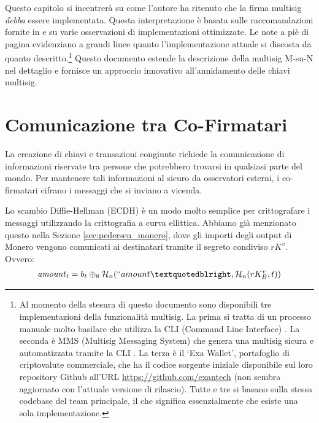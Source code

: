 Questo capitolo si incentrerà su come l'autore ha ritenuto che la firma multisig \emph{debba} essere implementata. Questa interpretazione è basata sulle raccomandazioni fornite in \cite{MRL-0009-multisig} e su varie osservazioni di implementazioni ottimizzate. Le note a piè di pagina evidenziano a grandi linee quanto l'implementazione attuale si discosta da quanto descritto.\footnote{Al momento della stesura di questo documento sono disponibili tre implementazioni della funzionalità multisig. La prima si tratta di un processo manuale molto basilare che utilizza la CLI (Command Line Interface) \cite{cli-22multisig-instructions}. La seconda è MMS (Multisig Messaging System) che genera una multisig sicura e automatizzata tramite la CLI \cite{mms-manual, mms-project-proposal}. La terza è il `Exa Wallet', portafoglio di criptovalute commerciale, che ha il codice sorgente iniziale disponibile sul loro repository Github all'URL \url{https://github.com/exantech} (non sembra aggiornato con l'attuale versione di rilascio). Tutte e tre si basano sulla stessa codebase del team principale, il che significa essenzialmente che esiste una sola implementazione.} Questo documento estende la descrizione della multisig M-su-N nel dettaglio e fornisce un approccio innovativo all'annidamento delle chiavi multisig.



\section{Comunicazione tra Co-Firmatari}
\label{sec:communicating}

La creazione di chiavi e transazioni congiunte richiede la comunicazione di informazioni riservate tra persone che potrebbero trovarsi in qualsiasi parte del mondo. Per mantenere tali informazioni al sicuro da osservatori esterni, i co-firmatari cifrano i messaggi che si inviano a vicenda.

Lo scambio Diffie-Hellman (ECDH) è un modo molto semplice per crittografare i messaggi utilizzando la crittografia a curva ellittica. Abbiamo già menzionato questo nella Sezione \ref{sec:pedersen_monero}, dove gli importi degli output di Monero vengono comunicati ai destinatari tramite il segreto condiviso $r K^v$. Ovvero:\vspace{.175cm}
\begin{align*}
  \mathit{amount}_t = b_t \oplus_8 \mathcal{H}_n(``amount”, \mathcal{H}_n(r K_B^v, t))
\end{align*}

